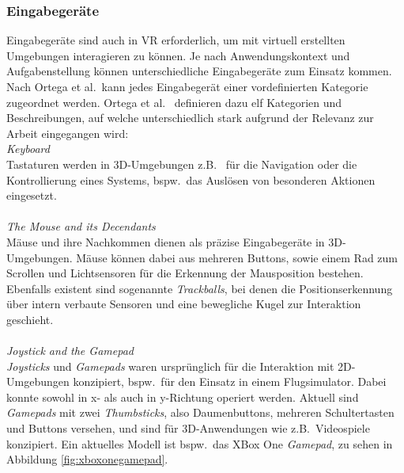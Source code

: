 \subsubsection{Eingabegeräte}
Eingabegeräte sind auch in VR erforderlich, um mit virtuell erstellten Umgebungen interagieren zu können. Je nach Anwendungskontext und Aufgabenstellung können unterschiedliche Eingabegeräte zum Einsatz kommen. 
Nach Ortega et al.~kann jedes Eingabegerät einer vordefinierten Kategorie zugeordnet werden. Ortega et al.~ definieren dazu elf Kategorien und Beschreibungen, auf welche unterschiedlich stark aufgrund der Relevanz zur Arbeit eingegangen wird:\\

\noindent \textit{Keyboard}\\
Tastaturen werden in 3D-Umgebungen z.B.~ für die Navigation oder die Kontrollierung eines Systems, bspw.~das Auslösen von besonderen Aktionen eingesetzt.\\
\\
\noindent \textit{The Mouse and its Decendants}\\
Mäuse und ihre Nachkommen dienen als präzise Eingabegeräte in 3D-Umgebungen. Mäuse können dabei aus mehreren Buttons, sowie einem Rad zum Scrollen und Lichtsensoren für die Erkennung der Mausposition bestehen. Ebenfalls existent sind sogenannte \textit{Trackballs}, bei denen die Positionserkennung über intern verbaute Sensoren und eine bewegliche Kugel zur Interaktion geschieht.\\
\\
\noindent \textit{Joystick and the Gamepad}\\
\textit{Joysticks} und \textit{Gamepads} waren ursprünglich für die Interaktion mit 2D-Umgebungen konzipiert, bspw.~für den Einsatz in einem Flugsimulator. Dabei konnte sowohl in x- als auch in y-Richtung operiert werden. Aktuell sind \textit{Gamepads} mit zwei \textit{Thumbsticks}, also Daumenbuttons, mehreren Schultertasten und Buttons versehen, und sind für 3D-Anwendungen wie z.B.~Videospiele konzipiert. Ein aktuelles Modell ist bspw.~das XBox One \textit{Gamepad}, zu sehen in Abbildung \ref{fig:xboxonegamepad}.\\

